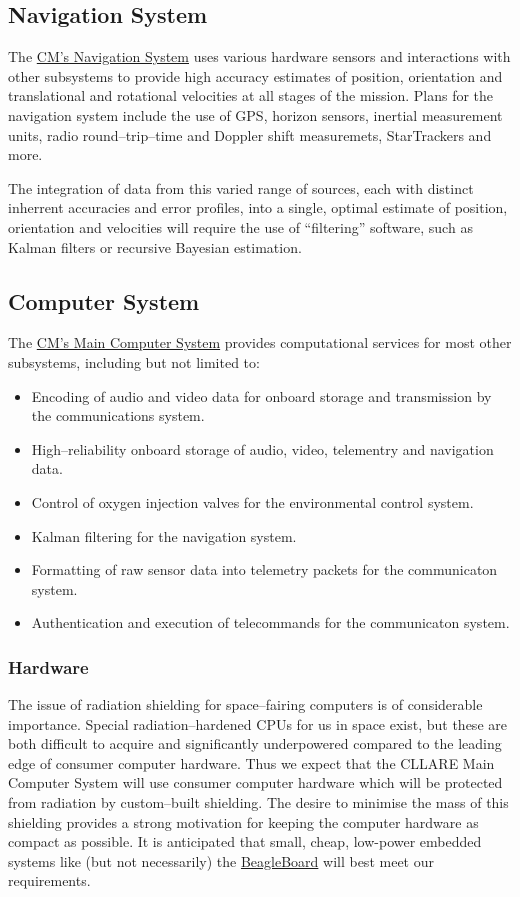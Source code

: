 \documentclass{report}
\begin{document}
\subsection{Navigation System}

The \href{http://cstart.org/wiki/CLLARE_CM_Navigation_System}{CM's Navigation System} uses various hardware sensors and interactions with other subsystems to provide high accuracy estimates of position, orientation and translational and rotational velocities at all stages of the mission.  Plans for the navigation system include the use of GPS, horizon sensors, inertial measurement units, radio round--trip--time and Doppler shift measuremets, StarTrackers and more.

The integration of data from this varied range of sources, each with distinct inherrent accuracies and error profiles, into a single, optimal estimate of position, orientation and velocities will require the use of ``filtering'' software, such as Kalman filters or recursive Bayesian estimation.

\subsection{Computer System}

The \href{http://cstart.org/wiki/CLLARE_Main_Computer_System}{CM's Main Computer System} provides computational services for most other subsystems, including but not limited to:
\begin{itemize}
\item Encoding of audio and video data for onboard storage and transmission by the communications system.
\item High--reliability onboard storage of audio, video, telementry and navigation data.
\item Control of oxygen injection valves for the environmental control system.
\item Kalman filtering for the navigation system.
\item Formatting of raw sensor data into telemetry packets for the communicaton system.
\item Authentication and execution of telecommands for the communicaton system.
\end{itemize}

\subsubsection{Hardware}

The issue of radiation shielding for space--fairing computers is of considerable importance.  Special radiation--hardened CPUs for us in space exist, but these are both difficult to acquire and significantly underpowered compared to the leading edge of consumer computer hardware.  Thus we expect that the CLLARE Main Computer System will use consumer computer hardware which will be protected from radiation by custom--built shielding.  The desire to minimise the mass of this shielding provides a strong motivation for keeping the computer hardware as compact as possible.  It is anticipated that small, cheap, low-power embedded systems like (but not necessarily) the \href{http://beagleboard.org}{BeagleBoard} will best meet our requirements.
\end{document}
